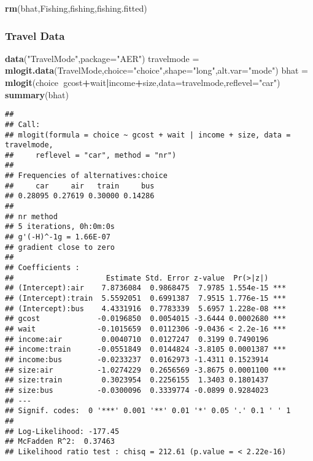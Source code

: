 \documentclass[
]{article}
\newenvironment{Shaded}{\begin{snugshade}}{\end{snugshade}}
\newcommand{\DataTypeTok}[1]{\textcolor[rgb]{0.13,0.29,0.53}{#1}}
\newcommand{\KeywordTok}[1]{\textcolor[rgb]{0.13,0.29,0.53}{\textbf{#1}}}
\newcommand{\NormalTok}[1]{#1}
\newcommand{\OperatorTok}[1]{\textcolor[rgb]{0.81,0.36,0.00}{\textbf{#1}}}
\newcommand{\StringTok}[1]{\textcolor[rgb]{0.31,0.60,0.02}{#1}}
\begin{document}
\begin{Shaded}
\begin{Highlighting}[]
\KeywordTok{rm}\NormalTok{(bhat,Fishing,fishing,fishing.fitted)}
\end{Highlighting}
\end{Shaded}

\hypertarget{travel-data}{%
\subsubsection{Travel Data}\label{travel-data}}

\begin{Shaded}
\begin{Highlighting}[]
\KeywordTok{data}\NormalTok{(}\StringTok{"TravelMode"}\NormalTok{,}\DataTypeTok{package=}\StringTok{"AER"}\NormalTok{)}
\NormalTok{travelmode     =}\StringTok{ }\KeywordTok{mlogit.data}\NormalTok{(TravelMode,}\DataTypeTok{choice=}\StringTok{"choice"}\NormalTok{,}\DataTypeTok{shape=}\StringTok{"long"}\NormalTok{,}\DataTypeTok{alt.var=}\StringTok{"mode"}\NormalTok{)}
\NormalTok{bhat           =}\StringTok{ }\KeywordTok{mlogit}\NormalTok{(choice}\OperatorTok{~}\NormalTok{gcost}\OperatorTok{+}\NormalTok{wait}\OperatorTok{|}\NormalTok{income}\OperatorTok{+}\NormalTok{size,}\DataTypeTok{data=}\NormalTok{travelmode,}\DataTypeTok{reflevel=}\StringTok{"car"}\NormalTok{)}
\KeywordTok{summary}\NormalTok{(bhat)}
\end{Highlighting}
\end{Shaded}

\begin{verbatim}
## 
## Call:
## mlogit(formula = choice ~ gcost + wait | income + size, data = travelmode, 
##     reflevel = "car", method = "nr")
## 
## Frequencies of alternatives:choice
##     car     air   train     bus 
## 0.28095 0.27619 0.30000 0.14286 
## 
## nr method
## 5 iterations, 0h:0m:0s 
## g'(-H)^-1g = 1.66E-07 
## gradient close to zero 
## 
## Coefficients :
##                     Estimate Std. Error z-value  Pr(>|z|)    
## (Intercept):air    7.8736084  0.9868475  7.9785 1.554e-15 ***
## (Intercept):train  5.5592051  0.6991387  7.9515 1.776e-15 ***
## (Intercept):bus    4.4331916  0.7783339  5.6957 1.228e-08 ***
## gcost             -0.0196850  0.0054015 -3.6444 0.0002680 ***
## wait              -0.1015659  0.0112306 -9.0436 < 2.2e-16 ***
## income:air         0.0040710  0.0127247  0.3199 0.7490196    
## income:train      -0.0551849  0.0144824 -3.8105 0.0001387 ***
## income:bus        -0.0233237  0.0162973 -1.4311 0.1523914    
## size:air          -1.0274229  0.2656569 -3.8675 0.0001100 ***
## size:train         0.3023954  0.2256155  1.3403 0.1801437    
## size:bus          -0.0300096  0.3339774 -0.0899 0.9284023    
## ---
## Signif. codes:  0 '***' 0.001 '**' 0.01 '*' 0.05 '.' 0.1 ' ' 1
## 
## Log-Likelihood: -177.45
## McFadden R^2:  0.37463 
## Likelihood ratio test : chisq = 212.61 (p.value = < 2.22e-16)
\end{verbatim}
\end{document}
